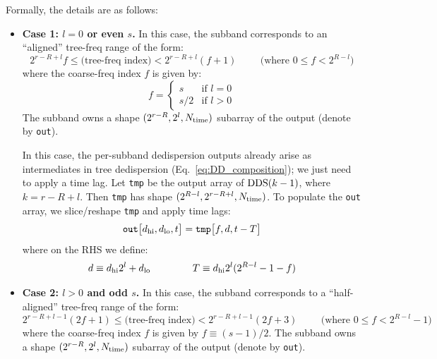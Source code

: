 \documentclass{article}
\numberwithin{equation}{section}   %
\def\DDS{{\rm DDS}}
\begin{document}
Formally, the details are as follows:

\begin{itemize}

\item {\bf Case 1: $l=0$ or even $s$.}
In this case, the subband corresponds to an ``aligned'' tree-freq range of the form:
\begin{equation}
2^{r-R+l} f \le \mbox{(tree-freq index)} < 2^{r-R+l}(f+1) \hspace{1cm} \mbox{(where $0 \le f < 2^{R-l}$)}
\end{equation}
where the coarse-freq index $f$ is given by:
\begin{equation}
f = \begin{cases} s & \mbox{if } l=0 \\ s/2 & \mbox{if } l > 0 \end{cases}
\end{equation}
The subband owns a shape $(2^{r-R}, 2^l, N_{\rm time})$ subarray of the output (denote by \verb|out|).

In this case, the per-subband dedispersion outputs already arise as intermediates in tree dedispersion
(Eq.\ \ref{eq:DD_composition}); we just need to apply a time lag.
Let \verb|tmp| be the output array of $\DDS(k-1)$, where $k=r-R+l$. 
Then \verb|tmp| has shape $(2^{R-l}, 2^{r-R+l}, N_{\rm time})$.
To populate the \verb|out| array, we slice/reshape \verb|tmp| and apply time lags:
\begin{equation}
{\tt out}\big[ d_{\rm hi}, d_{\rm lo}, t \big] = {\tt tmp}\big[ f, d, t - T \big]
\end{equation}
where on the RHS we define:
\begin{equation}
d \equiv d_{\rm hi} 2^l + d_{\rm lo}   \hspace{1.5cm} T \equiv d_{\rm hi} 2^l (2^{R-l}-1-f)
\end{equation}

\item {\bf Case 2: $l>0$ and odd $s$.}
In this case, the subband corresponds to a ``half-aligned'' tree-freq range of the form:
\begin{equation}
2^{r-R+l-1} (2f+1) \le \mbox{(tree-freq index)} < 2^{r-R+l-1}(2f+3) \hspace{1cm} \mbox{(where $0 \le f < 2^{R-l}-1$)}
\end{equation}
where the coarse-freq index $f$ is given by $f \equiv (s-1)/2$.
The subband owns a shape $(2^{r-R}, 2^l, N_{\rm time})$ subarray of the output (denote by \verb|out|).


\end{itemize}
\end{document}
